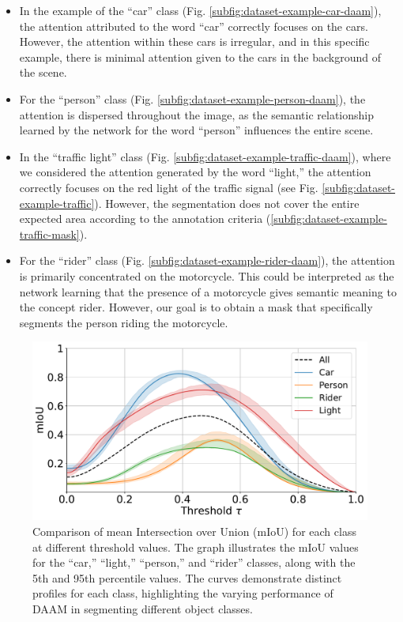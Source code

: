 \begin{itemize}
\item In the example of the ``car'' class (Fig. \ref{subfig:dataset-example-car-daam}), the attention attributed to the word ``car'' correctly focuses on the cars. However, the attention within these cars is irregular, and in this specific example, there is minimal attention given to the cars in the background of the scene.
\item For the ``person'' class (Fig. \ref{subfig:dataset-example-person-daam}), the attention is dispersed throughout the image, as the semantic relationship learned by the network for the word ``person'' influences the entire scene.
\item In the ``traffic light'' class (Fig. \ref{subfig:dataset-example-traffic-daam}), where we considered the attention generated by the word ``light,'' the attention correctly focuses on the red light of the traffic signal (see Fig. \ref{subfig:dataset-example-traffic}). However, the segmentation does not cover the entire expected area according to the annotation criteria (\ref{subfig:dataset-example-traffic-mask}).
\item For the ``rider'' class (Fig. \ref{subfig:dataset-example-rider-daam}), the attention is primarily concentrated on the motorcycle. This could be interpreted as the network learning that the presence of a motorcycle gives semantic meaning to the concept rider. However, our goal is to obtain a mask that specifically segments the person riding the motorcycle.
\end{itemize}

\begin{figure}
    \centering
    \includegraphics[width=1\columnwidth]{img/4-experiments/daam-threshold-iou-experiment-min-max.pdf}
    \caption[Comparison of mIoU per class using DAAM]{Comparison of mean Intersection over Union (mIoU) for each class at different threshold values. The graph illustrates the mIoU values for the ``car,'' ``light,'' ``person,'' and ``rider'' classes, along with the 5th and 95th percentile values. The curves demonstrate distinct profiles for each class, highlighting the varying performance of DAAM in segmenting different object classes.}
    \label{fig:miou-class-curves}
\end{figure}



